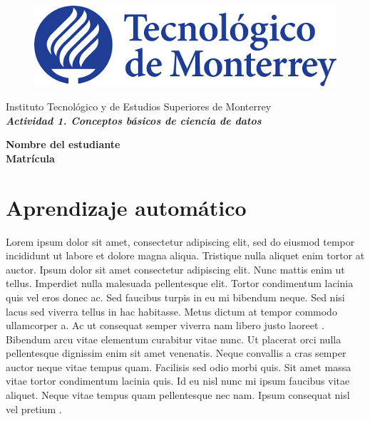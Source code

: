 \documentclass[12pt]{article}
\begin{document}
\thispagestyle{empty}
\begin{center}
\begin{figure}[h]
\centering
\includegraphics[width=.6\textwidth]{logo.jpg}\\
\end{figure}

\vspace{1cm}
\Large \sc  Instituto Tecnológico y de Estudios Superiores de Monterrey
\\

\vspace{2.5cm}
\Large \bf
\emph{Actividad 1. Conceptos básicos de ciencia de datos}

\vspace{2.5cm}
\Large \bf Nombre del estudiante\\
\vspace{0.3cm}
\Large \bf Matrícula\\
\vspace{3.5cm}
\normalsize \sc {}
\vspace{0.3cm}
\normalsize \sc {}
\end{center}

\newpage

\section{Aprendizaje automático}
Lorem ipsum dolor sit amet, consectetur adipiscing elit, sed do eiusmod tempor incididunt ut labore et dolore magna aliqua. Tristique nulla aliquet enim tortor at auctor. Ipsum dolor sit amet consectetur adipiscing elit. Nunc mattis enim ut tellus. Imperdiet nulla malesuada pellentesque elit. Tortor condimentum lacinia quis vel eros donec ac. Sed faucibus turpis in eu mi bibendum neque. Sed nisi lacus sed viverra tellus in hac habitasse. Metus dictum at tempor commodo ullamcorper a. Ac ut consequat semper viverra nam libero justo laoreet \cite{1}. \\

Bibendum arcu vitae elementum curabitur vitae nunc. Ut placerat orci nulla pellentesque dignissim enim sit amet venenatis. Neque convallis a cras semper auctor neque vitae tempus quam. Facilisis sed odio morbi quis. Sit amet massa vitae tortor condimentum lacinia quis. Id eu nisl nunc mi ipsum faucibus vitae aliquet. Neque vitae tempus quam pellentesque nec nam. Ipsum consequat nisl vel pretium \cite{2}.\\
\end{document}
